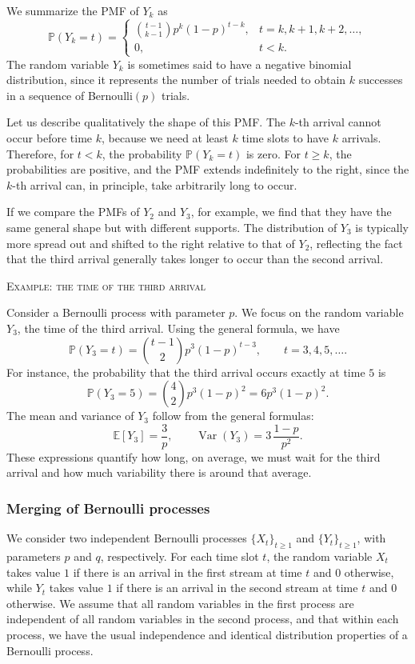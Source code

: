 We summarize the PMF of \(Y_k\) as
\[
\mathbb{P}(Y_k = t)
=
\begin{cases}
\binom{t-1}{k-1} p^{k} (1-p)^{t-k}, & t = k, k+1, k+2,\ldots,\\[3pt]
0, & t < k.
\end{cases}
\]
The random variable \(Y_k\) is sometimes said to have a negative binomial distribution, since it represents the number of trials needed to obtain \(k\) successes in a sequence of Bernoulli\((p)\) trials.  

Let us describe qualitatively the shape of this PMF.  
The \(k\)-th arrival cannot occur before time \(k\), because we need at least \(k\) time slots to have \(k\) arrivals.  
Therefore, for \(t < k\), the probability \(\mathbb{P}(Y_k = t)\) is zero.  
For \(t \geq k\), the probabilities are positive, and the PMF extends indefinitely to the right, since the \(k\)-th arrival can, in principle, take arbitrarily long to occur.  

If we compare the PMFs of \(Y_2\) and \(Y_3\), for example, we find that they have the same general shape but with different supports.  
The distribution of \(Y_3\) is typically more spread out and shifted to the right relative to that of \(Y_2\), reflecting the fact that the third arrival generally takes longer to occur than the second arrival.  

\bigskip
\textsc{Example: the time of the third arrival}

Consider a Bernoulli process with parameter \(p\).  
We focus on the random variable \(Y_3\), the time of the third arrival.  
Using the general formula, we have
\[
\mathbb{P}(Y_3 = t)
=
\binom{t-1}{2} p^{3} (1-p)^{t-3},
\qquad
t = 3,4,5,\ldots.
\]
For instance, the probability that the third arrival occurs exactly at time \(5\) is
\[
\mathbb{P}(Y_3 = 5)
=
\binom{4}{2} p^{3} (1-p)^{2}
=
6 p^{3} (1-p)^{2}.
\]
The mean and variance of \(Y_3\) follow from the general formulas:
\[
\mathbb{E}[Y_3] = \frac{3}{p},
\qquad
\operatorname{Var}(Y_3) = 3\,\frac{1-p}{p^{2}}.
\]
These expressions quantify how long, on average, we must wait for the third arrival and how much variability there is around that average.

\subsubsection{Merging of Bernoulli processes}

We consider two independent Bernoulli processes \(\{X_t\}_{t \geq 1}\) and \(\{Y_t\}_{t \geq 1}\), with parameters \(p\) and \(q\), respectively.  
For each time slot \(t\), the random variable \(X_t\) takes value \(1\) if there is an arrival in the first stream at time \(t\) and \(0\) otherwise, while \(Y_t\) takes value \(1\) if there is an arrival in the second stream at time \(t\) and \(0\) otherwise.  
We assume that all random variables in the first process are independent of all random variables in the second process, and that within each process, we have the usual independence and identical distribution properties of a Bernoulli process.  

